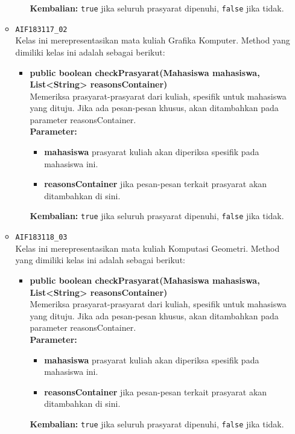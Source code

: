 \begin{enumerate}
\begin{itemize}
\begin{itemize}
\begin{itemize}
			\end{itemize}
			\textbf{Kembalian:} \texttt{true} jika seluruh prasyarat dipenuhi, \texttt{false} jika tidak.
		\end{itemize}
		\item \texttt{AIF183117\_02} \\
		Kelas ini merepresentasikan mata kuliah Grafika Komputer. Method yang dimiliki kelas ini adalah sebagai berikut: 
		\begin{itemize}
			\item \textbf{public boolean checkPrasyarat(Mahasiswa mahasiswa, List<String> reasonsContainer)}\\
			Memeriksa prasyarat-prasyarat dari kuliah, spesifik untuk mahasiswa yang dituju. Jika ada pesan-pesan khusus, akan ditambahkan pada parameter reasonsContainer.\\
			\textbf{Parameter:}
			\begin{itemize}
				\item \textbf{mahasiswa} prasyarat kuliah akan diperiksa spesifik pada mahasiswa ini.
				\item \textbf{reasonsContainer} jika pesan-pesan terkait prasyarat akan ditambahkan di sini.
			\end{itemize}
			\textbf{Kembalian:} \texttt{true} jika seluruh prasyarat dipenuhi, \texttt{false} jika tidak.
		\end{itemize}
		\item \texttt{AIF183118\_03} \\
		Kelas ini merepresentasikan mata kuliah Komputasi Geometri. Method yang dimiliki kelas ini adalah sebagai berikut: 
		\begin{itemize}
			\item \textbf{public boolean checkPrasyarat(Mahasiswa mahasiswa, List<String> reasonsContainer)}\\
			Memeriksa prasyarat-prasyarat dari kuliah, spesifik untuk mahasiswa yang dituju. Jika ada pesan-pesan khusus, akan ditambahkan pada parameter reasonsContainer.\\
			\textbf{Parameter:}
			\begin{itemize}
				\item \textbf{mahasiswa} prasyarat kuliah akan diperiksa spesifik pada mahasiswa ini.
				\item \textbf{reasonsContainer} jika pesan-pesan terkait prasyarat akan ditambahkan di sini.
			\end{itemize}
			\textbf{Kembalian:} \texttt{true} jika seluruh prasyarat dipenuhi, \texttt{false} jika tidak.

\end{itemize}
\end{itemize}
\end{enumerate}

